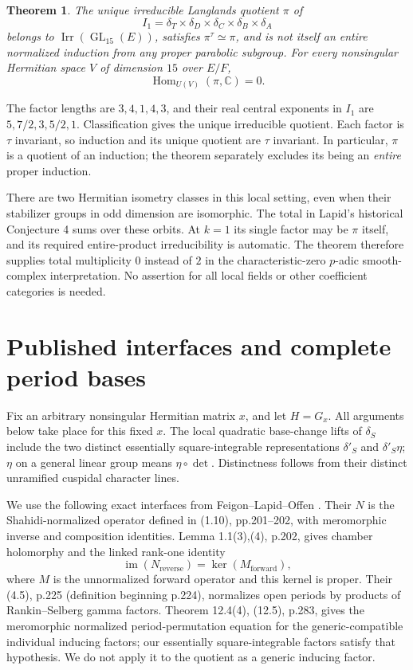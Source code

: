 \documentclass[11pt]{article}
\newtheorem{theorem}{Theorem}
\newcommand{\Hom}{\operatorname{Hom}}
\newcommand{\GL}{\operatorname{GL}}
\newcommand{\Irr}{\operatorname{Irr}}
\newcommand{\C}{\mathbb C}
\begin{document}
\begin{theorem}\label{main}
The unique irreducible Langlands quotient $\pi$ of
\[
I_1=\delta_T\times\delta_D\times\delta_C\times\delta_B\times\delta_A
\]
belongs to $\Irr(\GL_{15}(E))$, satisfies $\pi^\tau\simeq\pi$, and is not itself an entire normalized induction from any proper parabolic subgroup. For every nonsingular Hermitian space $V$ of dimension $15$ over $E/F$,
\[
\Hom_{U(V)}(\pi,\C)=0.
\]
\end{theorem}

The factor lengths are $3,4,1,4,3$, and their real central exponents in $I_1$ are $5,7/2,3,5/2,1$. Classification gives the unique irreducible quotient. Each factor is $\tau$ invariant, so induction and its unique quotient are $\tau$ invariant. In particular, $\pi$ is a quotient of an induction; the theorem separately excludes its being an \emph{entire} proper induction.

There are two Hermitian isometry classes in this local setting, even when their stabilizer groups in odd dimension are isomorphic. The total in Lapid's historical Conjecture 4 \cite[p.734, \S5.3]{OWR} sums over these orbits. At $k=1$ its single factor may be $\pi$ itself, and its required entire-product irreducibility is automatic. The theorem therefore supplies total multiplicity $0$ instead of $2$ in the characteristic-zero $p$-adic smooth-complex interpretation. No assertion for all local fields or other coefficient categories is needed.

\section{Published interfaces and complete period bases}
Fix an arbitrary nonsingular Hermitian matrix $x$, and let $H=G_x$. All arguments below take place for this fixed $x$. The local quadratic base-change lifts of $\delta_S$ include the two distinct essentially square-integrable representations $\delta'_S$ and $\delta'_S\eta$; $\eta$ on a general linear group means $\eta\circ\det$. Distinctness follows from their distinct unramified cuspidal character lines.

We use the following exact interfaces from Feigon--Lapid--Offen \cite{FLO}. Their $N$ is the Shahidi-normalized operator defined in (1.10), pp.201--202, with meromorphic inverse and composition identities. Lemma 1.1(3),(4), p.202, gives chamber holomorphy and the linked rank-one identity
\[
\operatorname{im}(N_{\mathrm{reverse}})=\ker(M_{\mathrm{forward}}),
\]
where $M$ is the unnormalized forward operator and this kernel is proper. Their (4.5), p.225 (definition beginning p.224), normalizes open periods by products of Rankin--Selberg gamma factors. Theorem 12.4(4), (12.5), p.283, gives the meromorphic normalized period-permutation equation for the generic-compatible individual inducing factors; our essentially square-integrable factors satisfy that hypothesis. We do not apply it to the quotient as a generic inducing factor.
\end{document}
